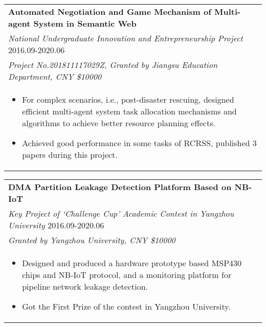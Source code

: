 \documentclass{resume}
\begin{document}
\begin{tabular*}{16.2cm}{l@{\extracolsep{\fill}}}
  \textbf{Automated Negotiation and Game Mechanism of Multi-agent System in Semantic Web}\\
  \emph{National Undergraduate Innovation and Entrepreneurship Project} \hfill 2016.09-2020.06\\
  \emph{Project No.201811117029Z, Granted by Jiangsu Education Department, CNY \$10000}\\
  \multicolumn{1}{p{16.2cm}}{
    \vspace{-0.15cm}  
  \begin{itemize}
      \item For complex scenarios, i.e., post-disaster rescuing, designed efficient multi-agent system task allocation mechanisms and algorithms to achieve better resource planning effects.
      \item Achieved good performance in some tasks of RCRSS, published 3 papers during this project.
      \end{itemize}}
  \end{tabular*}

  \vspace{-0.5cm}
\begin{tabular*}{16.2cm}{l@{\extracolsep{\fill}}}
\textbf{DMA Partition Leakage Detection Platform Based on NB-IoT} \\
\emph{Key Project of `Challenge Cup' Academic Contest in Yangzhou University} \hfill 2016.09-2020.06\\
\emph{Granted by Yangzhou University, CNY \$10000}\\
\multicolumn{1}{p{16.4cm}}{
  \vspace{-0.15cm}  
\begin{itemize}
    \item Designed and produced a hardware prototype based MSP430 chips and NB-IoT protocol, and a monitoring platform for pipeline network leakage detection.
    \item Got the First Prize of the contest in Yangzhou University.
    \end{itemize}}
\end{tabular*}

\vspace{-0.4cm} 

\end{document}

